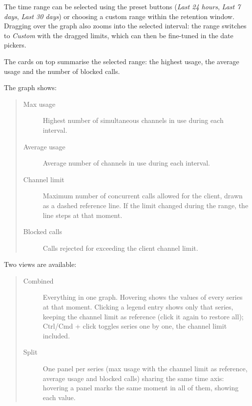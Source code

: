 \documentclass[letterpaper,10pt,english]{sphinxmanual}
\begin{document}
The time range can be selected using the preset buttons (\emph{Last 24 hours}, \emph{Last 7 days}, \emph{Last 30 days}) or choosing
a custom range within the retention window. Dragging over the graph also zooms into the selected interval: the range
switches to \emph{Custom} with the dragged limits, which can then be fine-tuned in the date pickers.

The cards on top summarise the selected range: the highest usage, the average usage and the number of blocked calls.

The graph shows:
\begin{quote}
\begin{description}
\item[{Max usage}] \leavevmode
Highest number of simultaneous channels in use during each interval.

\item[{Average usage}] \leavevmode
Average number of channels in use during each interval.

\item[{Channel limit}] \leavevmode
Maximum number of concurrent calls allowed for the client, drawn as a dashed reference line. If the limit
changed during the range, the line steps at that moment.

\item[{Blocked calls}] \leavevmode
Calls rejected for exceeding the client channel limit.

\end{description}
\end{quote}

Two views are available:
\begin{quote}
\begin{description}
\item[{Combined}] \leavevmode
Everything in one graph. Hovering shows the values of every series at that moment. Clicking a legend entry
shows only that series, keeping the channel limit as reference (click it again to restore all); Ctrl/Cmd +
click toggles series one by one, the channel limit included.

\item[{Split}] \leavevmode
One panel per series (max usage with the channel limit as reference, average usage and blocked calls) sharing
the same time axis: hovering a panel marks the same moment in all of them, showing each value.

\end{description}
\end{quote}
\end{document}
